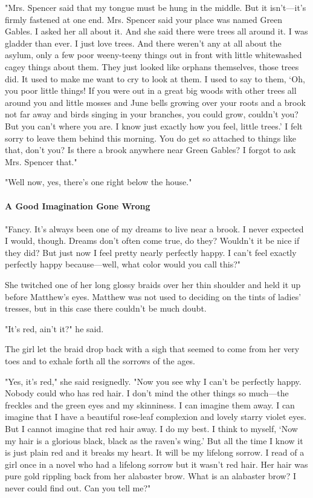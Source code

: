 \documentclass{article}
\begin{document}
"Mrs. Spencer said that my tongue must be hung in the middle. But it isn't---it's firmly fastened at one end. Mrs. Spencer said your place was named Green Gables. I asked her all about it. And she said there were trees all around it. I was gladder than ever. I just love trees. And there weren't any at all about the asylum, only a few poor weeny-teeny things out in front with little whitewashed cagey things about them. They just looked like orphans themselves, those trees did. It used to make me want to cry to look at them. I used to say to them, ‘Oh, you poor little things! If you were out in a great big woods with other trees all around you and little mosses and June bells growing over your roots and a brook not far away and birds singing in your branches, you could grow, couldn't you? But you can't where you are. I know just exactly how you feel, little trees.' I felt sorry to leave them behind this morning. You do get so attached to things like that, don't you? Is there a brook anywhere near Green Gables? I forgot to ask Mrs. Spencer that."

"Well now, yes, there's one right below the house."

\paragraph{A Good Imagination Gone Wrong}
"Fancy. It's always been one of my dreams to live near a brook. I never expected I would, though. Dreams don't often come true, do they? Wouldn't it be nice if they did? But just now I feel pretty nearly perfectly happy. I can't feel exactly perfectly happy because---well, what color would you call this?"

She twitched one of her long glossy braids over her thin shoulder and held it up before Matthew's eyes. Matthew was not used to deciding on the tints of ladies' tresses, but in this case there couldn't be much doubt.

"It's red, ain't it?" he said.

The girl let the braid drop back with a sigh that seemed to come from her very toes and to exhale forth all the sorrows of the ages.

"Yes, it's red," she said resignedly. "Now you see why I can't be perfectly happy. Nobody could who has red hair. I don't mind the other things so much---the freckles and the green eyes and my skinniness. I can imagine them away. I can imagine that I have a beautiful rose-leaf complexion and lovely starry violet eyes. But I cannot imagine that red hair away. I do my best. I think to myself, ‘Now my hair is a glorious black, black as the raven's wing.' But all the time I know it is just plain red and it breaks my heart. It will be my lifelong sorrow. I read of a girl once in a novel who had a lifelong sorrow but it wasn't red hair. Her hair was pure gold rippling back from her alabaster brow. What is an alabaster brow? I never could find out. Can you tell me?"
\end{document}
